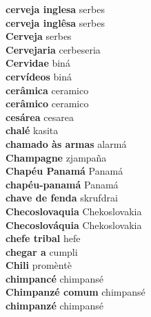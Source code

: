 \textbf{ cerveja inglesa  } serbes \\
\textbf{ cerveja inglêsa  } serbes \\
\textbf{ Cerveja  } serbes \\
\textbf{ Cervejaria  } cerbeseria \\
\textbf{ Cervidae  } biná \\
\textbf{ cervídeos  } biná \\
\textbf{ cerâmica  } ceramico \\
\textbf{ cerâmico  } ceramico \\
\textbf{ cesárea  } cesarea \\
\textbf{ chalé  } kasita \\
\textbf{ chamado às armas  } alarmá \\
\textbf{ Champagne  } zjampaña \\
\textbf{ Chapéu Panamá  } Panamá \\
\textbf{ chapéu-panamá  } Panamá \\
\textbf{ chave de fenda  } skrufdrai \\
\textbf{ Checoslovaquia  } Chekoslovakia \\
\textbf{ Checoslováquia  } Chekoslovakia \\
\textbf{ chefe tribal  } hefe \\
\textbf{ chegar a  } cumpli \\
\textbf{ Chili  } promèntè \\
\textbf{ chimpancé  } chimpansé \\
\textbf{ Chimpanzé comum  } chimpansé \\
\textbf{ chimpanzé  } chimpansé \\
